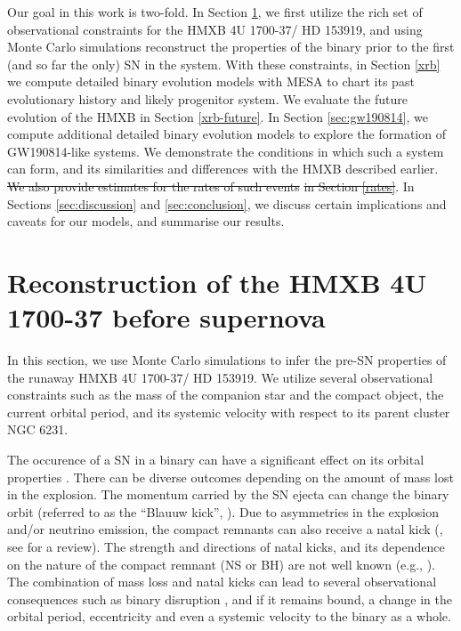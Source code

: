 \documentclass[linenumbers,trackchanges,twocolumn]{aastex701}
\begin{document}
Our goal in this work is two-fold. In Section \ref{sec:monte-carlo}, we first utilize the rich set of observational constraints for the HMXB 4U 1700-37/ HD 153919, and using Monte Carlo simulations reconstruct the properties of the binary prior to the first (and so far the only) SN in the system. With these constraints, in Section \ref{xrb} we compute detailed binary evolution models with \textsc{MESA} to chart its past evolutionary history and likely progenitor system. We evaluate the future evolution of the HMXB in Section \ref{xrb-future}. In Section \ref{sec:gw190814}, we compute additional detailed binary evolution models to explore the formation of GW190814-like systems. We demonstrate the conditions in which such a system can form, and its similarities and differences with the HMXB described earlier. \sout{We also provide estimates for the rates of such events} \sout{in Section \ref{rates}}. In Sections \ref{sec:discussion} and \ref{sec:conclusion}, we discuss certain implications and caveats for our models, and summarise our results.

\section{Reconstruction of the HMXB 4U 1700-37 before supernova} \label{sec:monte-carlo}

In this section, we use Monte Carlo simulations to infer the pre-SN properties of the runaway HMXB 4U 1700-37/ HD 153919. We utilize several observational constraints such as the mass of the companion star and the compact object, the current orbital period, and its systemic velocity with respect to its parent cluster NGC 6231.

The occurence of a SN in a binary can have a significant effect on its orbital properties \citep[e.g.,][]{1961BAN....15..291B, 1994astro.ph.12023B,2025OJAp....8E..85W}. There can be diverse outcomes depending on the amount of mass lost in the explosion. The momentum carried by the SN ejecta can change the binary orbit (referred to as the ``Blauuw kick'', \citealp{1961BAN....15..265B}). Due to asymmetries in the explosion and/or neutrino emission, the compact remnants can also receive a natal kick (\cite{1975Natur.253..698K}, see \cite{2025NewAR.10101734P} for a review). The strength and directions of natal kicks, and its dependence on the nature of the compact remnant (NS or BH) are not well known (e.g., \citealp{2024PhRvL.132s1403V, 2025PASP..137c4203N,2025ApJ...989L...8D, 2025arXiv250508857V}). The combination of mass loss and natal kicks can lead to several observational consequences such as binary disruption \citep[e.g.,][]{1997A&A...318..812D,2019A&A...624A..66R}, and if it remains bound, a change in the orbital period, eccentricity and even a systemic velocity to the binary as a whole.
\end{document}
